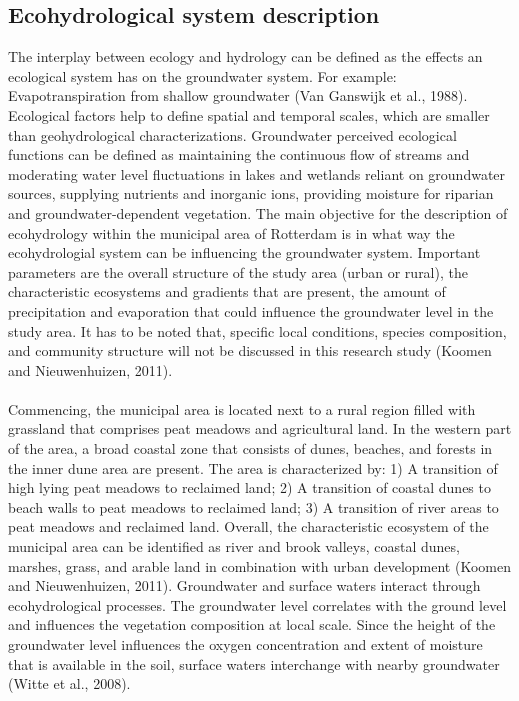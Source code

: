 \subsection{Ecohydrological system description}
The interplay between ecology and hydrology can be defined as the effects an ecological system has on the groundwater system. For example: Evapotranspiration from shallow groundwater (Van Ganswijk et al., 1988). Ecological factors help to define spatial and temporal scales, which are smaller than geohydrological characterizations. Groundwater perceived ecological functions can be defined as maintaining the continuous flow of streams and moderating water level fluctuations in lakes and wetlands reliant on groundwater sources, supplying nutrients and inorganic ions, providing moisture for riparian and groundwater-dependent vegetation. The main objective for the description of ecohydrology within the municipal area of Rotterdam is in what way the ecohydrologial system can be influencing the groundwater system. Important parameters are the overall structure of the study area (urban or rural), the characteristic ecosystems and gradients that are present, the amount of precipitation and evaporation that could influence the groundwater level in the study area. It has to be noted that, specific local conditions, species composition, and community structure will not be discussed in this research study (Koomen and Nieuwenhuizen, 2011).\\
\\
Commencing, the municipal area is located next to a rural region filled with grassland that comprises peat meadows and agricultural land. In the western part of the area, a broad coastal zone that consists of dunes, beaches, and forests in the inner dune area are present. The area is characterized by: 1) A transition of high lying peat meadows to reclaimed land; 2) A transition of coastal dunes to beach walls to peat meadows to reclaimed land; 3) A transition of river areas to peat meadows and reclaimed land. Overall, the characteristic ecosystem of the municipal area can be identified as river and brook valleys, coastal dunes, marshes, grass, and arable land in combination with urban development (Koomen and Nieuwenhuizen, 2011). Groundwater and surface waters interact through ecohydrological processes. The groundwater level correlates with the ground level and influences the vegetation composition at local scale. Since the height of the groundwater level influences the oxygen concentration and extent of moisture that is available in the soil, surface waters interchange with nearby groundwater (Witte et al., 2008). 

